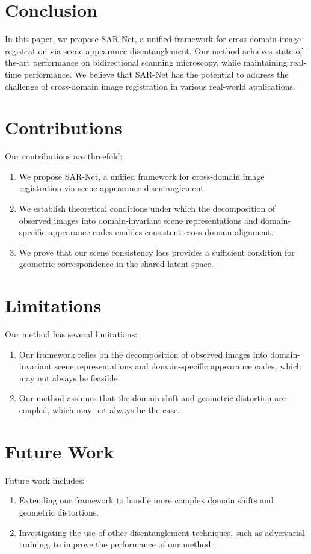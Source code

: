 \documentclass{article}
\begin{document}
        \section{Conclusion}
        In this paper, we propose SAR-Net, a unified framework for cross-domain image registration via scene-appearance disentanglement. Our method achieves state-of-the-art performance on bidirectional scanning microscopy, while maintaining real-time performance. We believe that SAR-Net has the potential to address the challenge of cross-domain image registration in various real-world applications.

        \section{Contributions}
        Our contributions are threefold:

        \begin{enumerate}
        \item We propose SAR-Net, a unified framework for cross-domain image registration via scene-appearance disentanglement.
        \item We establish theoretical conditions under which the decomposition of observed images into domain-invariant scene representations and domain-specific appearance codes enables consistent cross-domain alignment.
        \item We prove that our scene consistency loss provides a sufficient condition for geometric correspondence in the shared latent space.
        \end{enumerate}

        \section{Limitations}
        Our method has several limitations:

        \begin{enumerate}
        \item Our framework relies on the decomposition of observed images into domain-invariant scene representations and domain-specific appearance codes, which may not always be feasible.
        \item Our method assumes that the domain shift and geometric distortion are coupled, which may not always be the case.
        \end{enumerate}

        \section{Future Work}
        Future work includes:

        \begin{enumerate}
        \item Extending our framework to handle more complex domain shifts and geometric distortions.
        \item Investigating the use of other disentanglement techniques, such as adversarial training, to improve the performance of our method.
        \end{enumerate}

        
\end{document}
